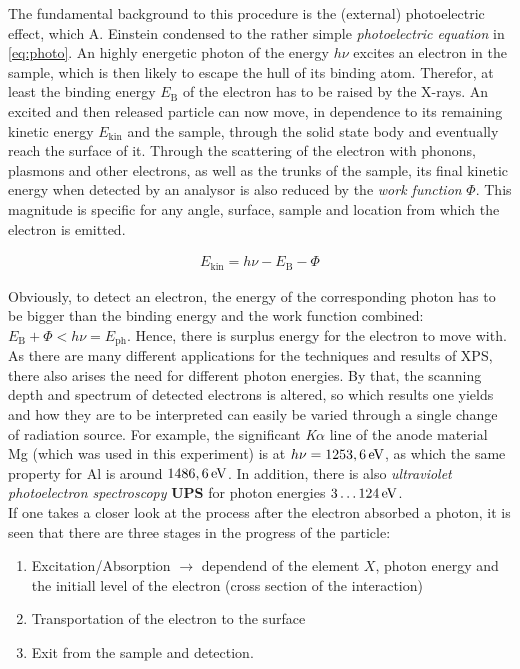 \documentclass[numbers=noenddot,a4paper,notitlepage,twoside,BCOR15mm]{article}
\newcommand{\ix}[1]{_\text{#1}}
\newcommand{\tilt}[1]{\textit{#1}}
\newcommand{\fett}[1]{\textbf{#1}}
\begin{document}
		The fundamental background to this procedure is the (external) photoelectric effect, which A. Einstein condensed to the rather simple \tilt{photoelectric equation} in \autoref{eq:photo}. An highly energetic photon of the energy $h\nu$ excites an electron in the sample, which is then likely to escape the hull of its binding atom. Therefor, at least the binding energy $E\ix{B}$ of the electron has to be raised by the X-rays. An excited and then released particle can now move, in dependence to its remaining kinetic energy $E\ix{kin}$ and the sample, through the solid state body and eventually reach the surface of it. Through the scattering of the electron with phonons, plasmons and other electrons, as well as the trunks of the sample, its final kinetic energy when detected by an analysor is also reduced by the \tilt{work function} $\Phi$. This magnitude is specific for any angle, surface, sample and location from which the electron is emitted.

			\begin{align}
				E\ix{kin}=h\nu-E\ix{B}-\Phi \label{eq:photo}
			\end{align}

		Obviously, to detect an electron, the energy of the corresponding photon has to be bigger than the binding energy and the work function combined: $E\ix{B}+\Phi<h\nu=E\ix{ph}$. Hence, there is surplus energy for the electron to move with. As there are many different applications for the techniques and results of XPS, there also arises the need for different photon energies. By that, the scanning depth and spectrum of detected electrons is altered, so which results one yields and how they are to be interpreted can easily be varied through a single change of radiation source. For example, the significant \tilt{K}$\alpha$ line of the anode material Mg (which was used in this experiment) is at $h\nu=\unit[1253,6]{eV}$, as which the same property for Al is around $\unit[1486,6]{eV}$. In addition, there is also \tilt{ultraviolet photoelectron spectroscopy} \fett{UPS} for photon energies $\unit[3\dots124]{eV}$.\\
		If one takes a closer look at the process after the electron absorbed a photon, it is seen that there are three stages in the progress of the particle:

			\begin{enumerate}
				\item Excitation/Absorption $\rightarrow$ dependend of the element $X$, photon energy and the initiall level of the electron (cross section of the interaction)
				\item Transportation of the electron to the surface
				\item Exit from the sample and detection.
			\end{enumerate}
\end{document}
